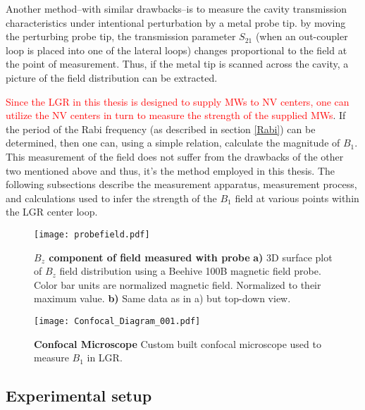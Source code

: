 Another method--with similar drawbacks--is to measure the cavity transmission characteristics under intentional perturbation by a metal probe tip. by moving the perturbing probe tip, the transmission parameter $S_{21}$ (when an out-coupler loop is placed into one of the lateral loops) changes proportional to the field at the point of measurement. Thus, if the metal tip is scanned across the cavity, a picture of the field distribution can be extracted.  

\textcolor{red}{Since the LGR in this thesis is designed to supply MWs to NV centers, one can utilize the NV centers in turn to measure the strength of the supplied MWs}. If the period of the Rabi frequency (as described in section \ref{Rabi}) can be determined, then one can, using a simple relation, calculate the magnitude of $B_1$. This measurement of the field does not suffer from the drawbacks of the other two mentioned above and thus, it's the method employed in this thesis. The following subsections describe the measurement apparatus, measurement process, and calculations used to infer the strength of the $B_1$ field at various points within the LGR center loop.

\begin{figure}[t!]
\centering
\texttt{[image: probefield.pdf]}  
\caption{\textbf{$B_z$ component of field measured with probe} \textbf{a)} 3D surface plot of $B_z$ field distribution using a Beehive 100B magnetic field probe. Color bar units are normalized magnetic field. Normalized to their maximum value. \textbf{b)} Same data as in a) but top-down view. }
\label{LGR_probe}
\end{figure}

\begin{landscape}
\begin{figure}[b!]
\centering
\texttt{[image: Confocal\_Diagram\_001.pdf]}  
\caption{\textbf{Confocal Microscope} Custom built confocal microscope used to measure $B_1$ in LGR.}
\label{LGR_confocal_diagram}
\end{figure}
\end{landscape}

\subsection{Experimental setup} \label{setup}

